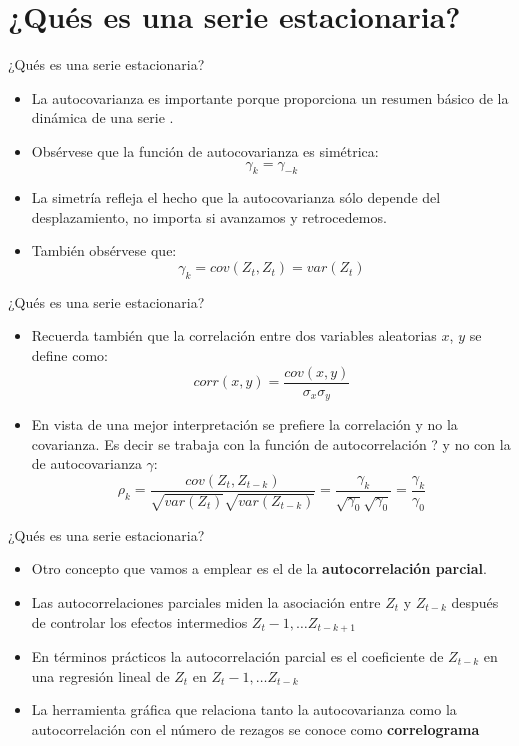 \section{¿Qués es una serie estacionaria?}
\begin{frame}{¿Qués es una serie estacionaria?}
	\begin{itemize}
		\item  La autocovarianza es importante porque proporciona un resumen básico de la dinámica de una serie .
		\item Obsérvese que la función de autocovarianza es simétrica:
			$$\gamma_k = \gamma_{-k}$$
		\item La simetría refleja el hecho que la autocovarianza sólo depende del desplazamiento, no importa si avanzamos y retrocedemos.
		\item También obsérvese que:
			$$\gamma_k = cov(Z_t,Z_t)=var(Z_t)$$
	\end{itemize}
\end{frame}
\begin{frame}{¿Qués es una serie estacionaria?}
	\begin{itemize}
		\item  Recuerda también que la correlación entre dos variables aleatorias $x$, $y$ se define como:
			$$corr(x,y) = \frac{cov(x,y)}{\sigma_x \sigma_y}$$
		\item En vista de una mejor interpretación se prefiere la correlación y no la covarianza. Es decir se trabaja con la función de autocorrelación ? y no con la de autocovarianza $\gamma$:
			$$\rho_k = \frac{cov(Z_t, Z_{t-k})}{\sqrt{var(Z_t)}\sqrt{var(Z_{t-k})}} = \frac{\gamma_k}{\sqrt{\gamma_0}\sqrt{\gamma_0}} = \frac{\gamma_k}{\gamma_0}$$
	\end{itemize}
\end{frame}
\begin{frame}{¿Qués es una serie estacionaria?}
	\begin{itemize}
		\item Otro concepto que vamos a emplear es el de la \textbf{autocorrelación parcial}.
		\item Las autocorrelaciones parciales miden la asociación entre $Z_t$ y $Z_{t-k}$ después de controlar los efectos intermedios $Z_t-1, \ldots Z_{t-k+1}$
		\item En términos prácticos la autocorrelación parcial es el coeficiente de $Z_{t-k}$ en una regresión lineal de $Z_t$ en $Z_t-1, \ldots Z_{t-k}$
		\item La herramienta gráfica que relaciona tanto la autocovarianza como la autocorrelación con el número de rezagos se conoce como \textbf{correlograma}
	\end{itemize}
\end{frame}
